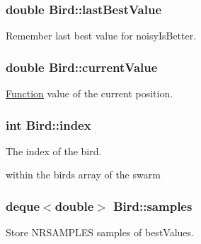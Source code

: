 \hypertarget{classBird_b37696e9097c484dac6b72f8dfb94ab6}{
\subsubsection{\setlength{\rightskip}{0pt plus 5cm}double {\bf Bird::lastBestValue}}}
\label{classBird_b37696e9097c484dac6b72f8dfb94ab6}


Remember last best value for noisyIsBetter. 

\hypertarget{classBird_7f3f0ebbdf398c6d71898fa21135777a}{
\subsubsection{\setlength{\rightskip}{0pt plus 5cm}double {\bf Bird::currentValue}}}
\label{classBird_7f3f0ebbdf398c6d71898fa21135777a}


\hyperlink{classFunction}{Function} value of the current position. 

\hypertarget{classBird_43bfb452fe35adad0d607b46fcd0d8cc}{
\subsubsection{\setlength{\rightskip}{0pt plus 5cm}int {\bf Bird::index}}}
\label{classBird_43bfb452fe35adad0d607b46fcd0d8cc}


The index of the bird. 

within the birds array of the swarm \hypertarget{classBird_cfe288b379ff142fde1e46df598c79b3}{
\subsubsection{\setlength{\rightskip}{0pt plus 5cm}deque$<$double$>$ {\bf Bird::samples}}}
\label{classBird_cfe288b379ff142fde1e46df598c79b3}


Store NRSAMPLES samples of bestValues. 

